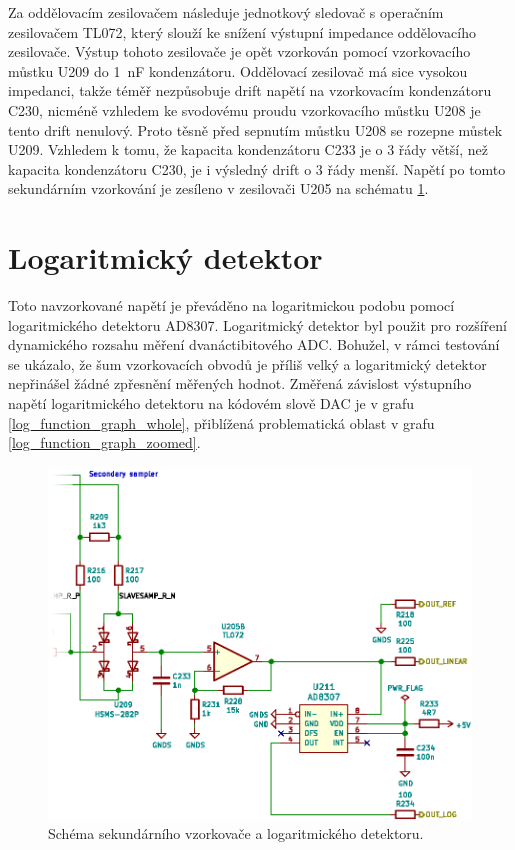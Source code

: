 Za oddělovacím zesilovačem následuje jednotkový sledovač s operačním zesilovačem TL072, který slouží ke snížení výstupní impedance oddělovacího zesilovače. Výstup tohoto zesilovače je opět vzorkován pomocí vzorkovacího můstku U209 do \SI{1}{\nano\farad} kondenzátoru. Oddělovací zesilovač má sice vysokou impedanci, takže téměř nezpůsobuje drift napětí na vzorkovacím kondenzátoru C230, nicméně vzhledem ke svodovému proudu vzorkovacího můstku U208 je tento drift nenulový. Proto těsně před sepnutím můstku U208 se rozepne můstek U209. Vzhledem k tomu, že kapacita kondenzátoru C233 je o 3 řády větší, než kapacita kondenzátoru C230, je i výsledný drift o 3 řády menší. Napětí po tomto sekundárním vzorkování je zesíleno v zesilovači U205 na schématu \ref{secondary_sampler_section_schematic}.

\section{Logaritmický detektor}

Toto navzorkované napětí je převáděno na logaritmickou podobu pomocí logaritmického detektoru AD8307. Logaritmický detektor byl použit pro rozšíření dynamického rozsahu měření dvanáctibitového \acrshort{ADC}. Bohužel, v rámci testování se ukázalo, že šum vzorkovacích obvodů je příliš velký a logaritmický detektor nepřinášel žádné zpřesnění měřených hodnot. Změřená závislost výstupního napětí logaritmického detektoru na kódovém slově \acrshort{DAC} je v grafu \ref{log_function_graph_whole}, přiblížená problematická oblast v grafu \ref{log_function_graph_zoomed}.

\begin{figure}[htbp]
\includegraphics[width=\textwidth,keepaspectratio]{images/secondary_sampler_section.eps}\caption{Schéma sekundárního vzorkovače a logaritmického detektoru.}\label{secondary_sampler_section_schematic}
\end{figure}


